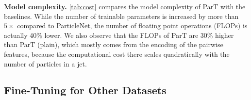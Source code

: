 \documentclass[nohyperref]{article}
\theoremstyle{plain}
\theoremstyle{definition}
\theoremstyle{remark}
\begin{document}
\textbf{Model complexity.} \cref{tab:cost} compares the model complexity of ParT with the baselines. While the number of trainable parameters is increased by more than $5\times$ compared to ParticleNet, the number of floating point operations (FLOPs) is actually 40\% lower. We also observe that the FLOPs of ParT are 30\% higher than ParT (plain), which mostly comes from the encoding of the pairwise features, because the computational cost there scales quadratically with the number of particles in a jet.

\begin{table}[bt]
\caption{Number of trainable parameters and FLOPs.}
\label{tab:cost}
\vskip 0.05in
\begin{center}
\end{center}
\vskip -0.2in
\end{table}


\subsection{Fine-Tuning for Other Datasets}
\label{sec:exp-finetune}
\end{document}
